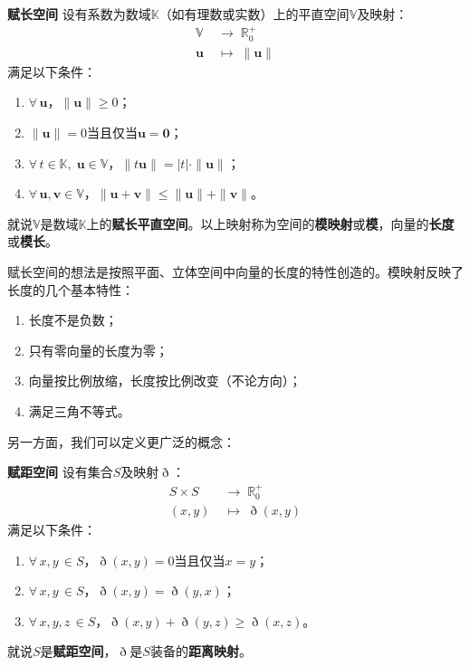 \documentclass[12pt,UTF8,fontset=none]{ctexbook}
\begin{document}
\begin{df}{\textbf{赋长空间}}
    设有系数为数域$\mathbb{K}$（如有理数或实数）上的平直空间$\mathbb{V}$及映射：
    \begin{align*}
        \mathbb{V} \;&\rightarrow \;\mathbb{R}_0^+ \\
        \mathbf{u} \;&\mapsto \;\| \mathbf{u} \|
    \end{align*}
    满足以下条件：
    \begin{enumerate}
        \item $\forall \, \mathbf{u}$，$\|\mathbf{u}\| \geqslant 0$；
        \item $\| \mathbf{u} \| = 0$当且仅当$\mathbf{u} = \mathbf{0}$；
        \item $\forall \, t \in \mathbb{K}, \; \mathbf{u}\in \mathbb{V}$，$\| t\mathbf{u}\| = |t|\cdot \|\mathbf{u}\|$；
        \item $\forall \, \mathbf{u}, \mathbf{v} \in \mathbb{V}$，$\|\mathbf{u} + \mathbf{v}\| \leqslant \|\mathbf{u}\| + \|\mathbf{v}\|$。
    \end{enumerate}
    就说$\mathbb{V}$是数域$\mathbb{K}$上的\textbf{赋长平直空间}。以上映射称为空间的\textbf{模映射}或\textbf{模}，向量的\textbf{长度}或\textbf{模长}。
\end{df}

赋长空间的想法是按照平面、立体空间中向量的长度的特性创造的。模映射反映了长度的几个基本特性：
\begin{enumerate}
    \item 长度不是负数；
    \item 只有零向量的长度为零；
    \item 向量按比例放缩，长度按比例改变（不论方向）；
    \item 满足三角不等式。
\end{enumerate}

另一方面，我们可以定义更广泛的概念：
\begin{df}{\textbf{赋距空间}}
    设有集合$S$及映射$\eth$：
    \begin{align*}
        S\times S \;&\rightarrow \; \mathbb{R}_0^+ \\
        (x, y) \;&\mapsto \; \eth(x, y)
    \end{align*}
    满足以下条件：
    \begin{enumerate}
        \item $\forall \, x, y\, \in S$，$\eth(x, y) = 0$当且仅当$x = y$；
        \item $\forall \, x, y\, \in S$，$\eth(x, y) = \eth(y, x)$；
        \item $\forall \, x, y, z\, \in S$，$\eth(x, y) + \eth(y, z) \geqslant \eth (x, z)$。
    \end{enumerate}
    就说$S$是\textbf{赋距空间}，$\eth$是$S$装备的\textbf{距离映射}。
\end{df}
\end{document}
